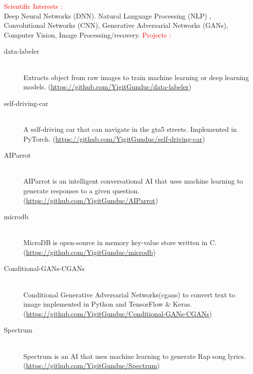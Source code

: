 \documentclass[a4paper]{article}
\begin{document}
\vskip 0.5cm
\textcolor{red}{\huge Scientific Interests : \hfill}\\
\vskip 0.1cm
Deep Neural Networks (DNN). Natural Language Processing (NLP) , Convolutional Networks (CNN),  Generative Adversarial Networks (GANs), Computer Vision, Image Processing/recovery.  
\vskip 0.5cm
\textcolor{red}{\huge Projects :\hfill }\\
\vskip 0.3cm
\hskip 1cm
\begin{minipage}{0.95\textwidth}
  \begin{description}
  \item[data-labeler]\hfill \\
    Extracts object from raw images to train machine learning or deep learning models. (\href{https://github.com/YigitGunduc/data-labeler}{https://github.com/YigitGunduc/data-labeler})
    
  \item[self-driving-car] \hfill \\
    A self-driving car that can navigate in the gta5 streets. Implemented in PyTorch. (\href{https://github.com/YigitGunduc/self-driving-car}{https://github.com/YigitGunduc/self-driving-car})
    
  \item[AIParrot] \hfill\\
    AIParrot is an intelligent conversational AI that uses machine learning to generate responses to a given question. (\href{https://github.com/YigitGunduc/AIParrot}{https://github.com/YigitGunduc/AIParrot})
    
  \item[microdb] \hfill\\
    MicroDB is open-source in memory key-value store written in C. (\href{https://github.com/YigitGunduc/microdb}{https://github.com/YigitGunduc/microdb})

  \item[Conditional-GANs-CGANs] \hfill\\
    Conditional Generative Adversarial Networks(cgans) to convert text to image implemented in Python and TensorFlow \& Keras. (\href{https://github.com/YigitGunduc/Conditional-GANs-CGANs}{https://github.com/YigitGunduc/Conditional-GANs-CGANs})
    
  \item[Spectrum] \hfill\\
    Spectrum is an AI that uses machine learning to generate Rap song lyrics. (\href{https://github.com/YigitGunduc/Spectrum}{https://github.com/YigitGunduc/Spectrum})

  \end{description}
\end{minipage}
\end{document}
